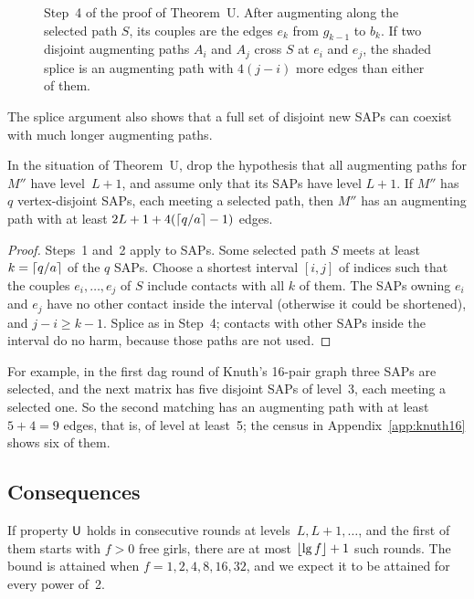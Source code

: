 \begin{figure}[ht]
\centering

\caption{Step~4 of the proof of Theorem~U. After augmenting along the
selected path $S$, its couples are the edges $e_k$ from $g_{k-1}$ to $b_k$.
If two disjoint augmenting paths $A_i$ and $A_j$ cross $S$ at $e_i$ and
$e_j$, the shaded splice is an augmenting path with $4(j-i)$ more edges
than either of them.}
\label{fig:splice}
\end{figure}

The splice argument also shows that a full set of disjoint new SAPs can
coexist with much longer augmenting paths.

\begin{proposition}
\label{prop:longpaths}
In the situation of Theorem~U, drop the hypothesis that all augmenting
paths for $M''$ have level~$L+1$, and assume only that its SAPs have level
$L+1$. If $M''$ has $q$ vertex-disjoint SAPs, each meeting a selected
path, then $M''$ has an augmenting path with at least
$2L+1+4(\lceil q/a\rceil-1)$ edges.
\end{proposition}

\begin{proof}
Steps~1 and~2 apply to SAPs. Some selected path $S$ meets at least
$k=\lceil q/a\rceil$ of the $q$ SAPs. Choose a shortest interval $[i,j]$ of
indices such that the couples $e_i,\ldots,e_j$ of $S$ include contacts with
all $k$ of them. The SAPs owning $e_i$ and $e_j$ have no other contact
inside the interval (otherwise it could be shortened), and $j-i\ge k-1$.
Splice as in Step~4; contacts with other SAPs inside the interval do no
harm, because those paths are not used.
\end{proof}

For example, in the first dag round of Knuth's 16-pair graph three SAPs
are selected, and the next matrix has five disjoint SAPs of level~3, each
meeting a selected one. So the second matching has an augmenting path
with at least $5+4=9$ edges, that is, of level at least~5; the census in
Appendix~\ref{app:knuth16} shows six of them.

\subsection{Consequences}

\begin{corollary}
If property $\mathsf U$ holds in consecutive rounds at levels~$L,L+1,\ldots$,
and the first of them starts with $f>0$ free girls, there are at most
$\lfloor\lg f\rfloor+1$ such rounds. The bound is attained when $f=1,2,4,8,16,32$,
and we expect it to be attained for every power of~2.
\end{corollary}


